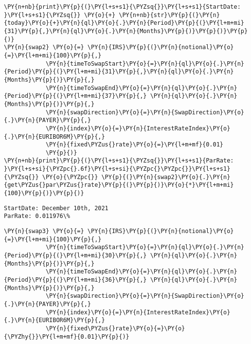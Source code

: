     \begin{tcolorbox}[breakable, size=fbox, boxrule=1pt, pad at break*=1mm,colback=cellbackground, colframe=cellborder]
\begin{Verbatim}[commandchars=\\\{\}]
\PY{n+nb}{print}\PY{p}{(}\PY{l+s+s1}{\PYZsq{}}\PY{l+s+s1}{StartDate: }\PY{l+s+s1}{\PYZsq{}} \PY{o}{+} \PY{n+nb}{str}\PY{p}{(}\PY{n}{today}\PY{o}{+}\PY{n}{ql}\PY{o}{.}\PY{n}{Period}\PY{p}{(}\PY{l+m+mi}{31}\PY{p}{,}\PY{n}{ql}\PY{o}{.}\PY{n}{Months}\PY{p}{)}\PY{p}{)}\PY{p}{)}
\PY{n}{swap2} \PY{o}{=} \PY{n}{IRS}\PY{p}{(}\PY{n}{notional}\PY{o}{=}\PY{l+m+mi}{100}\PY{p}{,}
            \PY{n}{timeToSwapStart}\PY{o}{=}\PY{n}{ql}\PY{o}{.}\PY{n}{Period}\PY{p}{(}\PY{l+m+mi}{31}\PY{p}{,}\PY{n}{ql}\PY{o}{.}\PY{n}{Months}\PY{p}{)}\PY{p}{,}
            \PY{n}{timeToSwapEnd}\PY{o}{=}\PY{n}{ql}\PY{o}{.}\PY{n}{Period}\PY{p}{(}\PY{l+m+mi}{37}\PY{p}{,} \PY{n}{ql}\PY{o}{.}\PY{n}{Months}\PY{p}{)}\PY{p}{,}
            \PY{n}{swapDirection}\PY{o}{=}\PY{n}{SwapDirection}\PY{o}{.}\PY{n}{PAYER}\PY{p}{,}
            \PY{n}{index}\PY{o}{=}\PY{n}{InterestRateIndex}\PY{o}{.}\PY{n}{EURIBOR6M}\PY{p}{,}
            \PY{n}{fixed\PYZus{}rate}\PY{o}{=}\PY{l+m+mf}{0.01}
            \PY{p}{)}
\PY{n+nb}{print}\PY{p}{(}\PY{l+s+s1}{\PYZsq{}}\PY{l+s+s1}{ParRate: }\PY{l+s+si}{\PYZpc{}.6f}\PY{l+s+si}{\PYZpc{}\PYZpc{}}\PY{l+s+s1}{\PYZsq{}} \PY{o}{\PYZpc{}} \PY{p}{(}\PY{n}{swap2}\PY{o}{.}\PY{n}{get\PYZus{}par\PYZus{}rate}\PY{p}{(}\PY{p}{)}\PY{o}{*}\PY{l+m+mi}{100}\PY{p}{)}\PY{p}{)}
\end{Verbatim}
\end{tcolorbox}

    \begin{Verbatim}[commandchars=\\\{\}]
StartDate: December 10th, 2021
ParRate: 0.011976\%
    \end{Verbatim}

    \begin{tcolorbox}[breakable, size=fbox, boxrule=1pt, pad at break*=1mm,colback=cellbackground, colframe=cellborder]
\begin{Verbatim}[commandchars=\\\{\}]
\PY{n}{swap3} \PY{o}{=} \PY{n}{IRS}\PY{p}{(}\PY{n}{notional}\PY{o}{=}\PY{l+m+mi}{100}\PY{p}{,}
            \PY{n}{timeToSwapStart}\PY{o}{=}\PY{n}{ql}\PY{o}{.}\PY{n}{Period}\PY{p}{(}\PY{l+m+mi}{30}\PY{p}{,} \PY{n}{ql}\PY{o}{.}\PY{n}{Months}\PY{p}{)}\PY{p}{,}
            \PY{n}{timeToSwapEnd}\PY{o}{=}\PY{n}{ql}\PY{o}{.}\PY{n}{Period}\PY{p}{(}\PY{l+m+mi}{36}\PY{p}{,} \PY{n}{ql}\PY{o}{.}\PY{n}{Months}\PY{p}{)}\PY{p}{,}
            \PY{n}{swapDirection}\PY{o}{=}\PY{n}{SwapDirection}\PY{o}{.}\PY{n}{PAYER}\PY{p}{,}
            \PY{n}{index}\PY{o}{=}\PY{n}{InterestRateIndex}\PY{o}{.}\PY{n}{EURIBOR6M}\PY{p}{,}
            \PY{n}{fixed\PYZus{}rate}\PY{o}{=}\PY{o}{\PYZhy{}}\PY{l+m+mf}{0.01}\PY{p}{)}
\end{Verbatim}
\end{tcolorbox}

